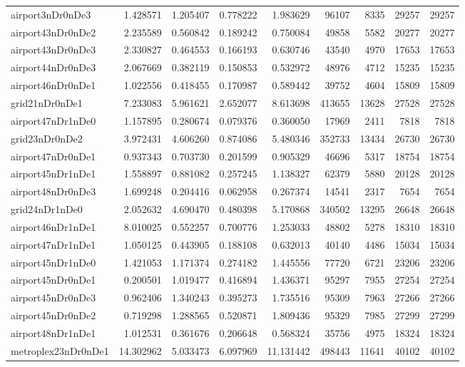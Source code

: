 \begin{longtable}{|l|r|r|r|r|r|r|r|r|}
airport3nDr0nDe3 & 1.428571 & 1.205407 & 0.778222 & 1.983629 & 96107 & 8335 & 29257 & 29257 \\
airport43nDr0nDe2 & 2.235589 & 0.560842 & 0.189242 & 0.750084 & 49858 & 5582 & 20277 & 20277 \\
airport43nDr0nDe3 & 2.330827 & 0.464553 & 0.166193 & 0.630746 & 43540 & 4970 & 17653 & 17653 \\
airport44nDr0nDe3 & 2.067669 & 0.382119 & 0.150853 & 0.532972 & 48976 & 4712 & 15235 & 15235 \\
airport46nDr0nDe1 & 1.022556 & 0.418455 & 0.170987 & 0.589442 & 39752 & 4604 & 15809 & 15809 \\
grid21nDr0nDe1 & 7.233083 & 5.961621 & 2.652077 & 8.613698 & 413655 & 13628 & 27528 & 27528 \\
airport47nDr1nDe0 & 1.157895 & 0.280674 & 0.079376 & 0.360050 & 17969 & 2411 & 7818 & 7818 \\
grid23nDr0nDe2 & 3.972431 & 4.606260 & 0.874086 & 5.480346 & 352733 & 13434 & 26730 & 26730 \\
airport47nDr0nDe1 & 0.937343 & 0.703730 & 0.201599 & 0.905329 & 46696 & 5317 & 18754 & 18754 \\
airport45nDr1nDe1 & 1.558897 & 0.881082 & 0.257245 & 1.138327 & 62379 & 5880 & 20128 & 20128 \\
airport48nDr0nDe3 & 1.699248 & 0.204416 & 0.062958 & 0.267374 & 14541 & 2317 & 7654 & 7654 \\
grid24nDr1nDe0 & 2.052632 & 4.690470 & 0.480398 & 5.170868 & 340502 & 13295 & 26648 & 26648 \\
airport46nDr1nDe1 & 8.010025 & 0.552257 & 0.700776 & 1.253033 & 48802 & 5278 & 18310 & 18310 \\
airport47nDr1nDe1 & 1.050125 & 0.443905 & 0.188108 & 0.632013 & 40140 & 4486 & 15034 & 15034 \\
airport45nDr1nDe0 & 1.421053 & 1.171374 & 0.274182 & 1.445556 & 77720 & 6721 & 23206 & 23206 \\
airport45nDr0nDe1 & 0.200501 & 1.019477 & 0.416894 & 1.436371 & 95297 & 7955 & 27254 & 27254 \\
airport45nDr0nDe3 & 0.962406 & 1.340243 & 0.395273 & 1.735516 & 95309 & 7963 & 27266 & 27266 \\
airport45nDr0nDe2 & 0.719298 & 1.288565 & 0.520871 & 1.809436 & 95329 & 7985 & 27299 & 27299 \\
airport48nDr1nDe1 & 1.012531 & 0.361676 & 0.206648 & 0.568324 & 35756 & 4975 & 18324 & 18324 \\
metroplex23nDr0nDe1 & 14.302962 & 5.033473 & 6.097969 & 11.131442 & 498443 & 11641 & 40102 & 40102 \\

\end{longtable}
